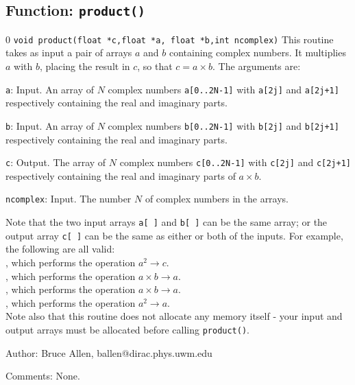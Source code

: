 \subsection{Function: \tt product()}
\setcounter{equation}0
{\tt void product(float *c,float *a, float *b,int ncomplex)}
This routine takes as input a pair of arrays $a$ and $b$ containing
complex numbers.  It multiplies $a$ with $b$,
placing the result in $c$, so that $c = a \times b$.
The arguments are:
\begin{description}
\item{\tt a}: Input.  An array of $N$ complex numbers {\tt a[0..2N-1]} with
  {\tt a[2j]} and {\tt a[2j+1]} respectively containing the real and
  imaginary parts.
\item{\tt b}: Input.  An array of $N$ complex numbers {\tt b[0..2N-1]} with
  {\tt b[2j]} and {\tt b[2j+1]} respectively containing the real and
  imaginary parts.
\item{\tt c}: Output.  The array of $N$ complex numbers {\tt c[0..2N-1]} with
  {\tt c[2j]} and {\tt c[2j+1]} respectively containing the real and
  imaginary parts of $a \times b$.
\item{\tt ncomplex}: Input.   The number $N$ of complex numbers in the arrays.
\end{description}
Note that the two input arrays {\tt a[ ]} and {\tt b[ ]} can be the same
array; or the output array {\tt c[ ]} can be the same as either or both of
the inputs.  For example, the following are all valid:\\
, which performs the operation $a^2 \rightarrow c$. \\
, which performs the operation $a \times b \rightarrow a$. \\
, which performs the operation $a \times b \rightarrow a$. \\
, which performs the operation $a^2 \rightarrow a$.\\
Note also that this routine does not allocate any memory itself - your input
and output arrays must be allocated before calling {\tt product()}.
\begin{description}
\item{Author:}
Bruce Allen, ballen@dirac.phys.uwm.edu
\item{Comments:}
None.
\end{description}
\clearpage

